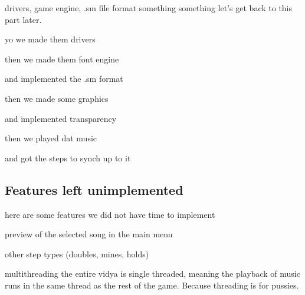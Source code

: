 drivers, game engine, .sm file format
something something let's get back to this part later.

yo we made them drivers

then we made them font engine

and implemented the .sm format

then we made some graphics

and implemented transparency

then we played dat music

and got the steps to synch up to it

\subsection{Features left unimplemented}
	here are some features we did not have time to implement


	preview of the selected song in the main menu

	other step types (doubles, mines, holds)

	multithreading
		the entire vidya is single threaded, meaning the playback of music runs in the same thread as the rest of the game. Because threading is for pussies.